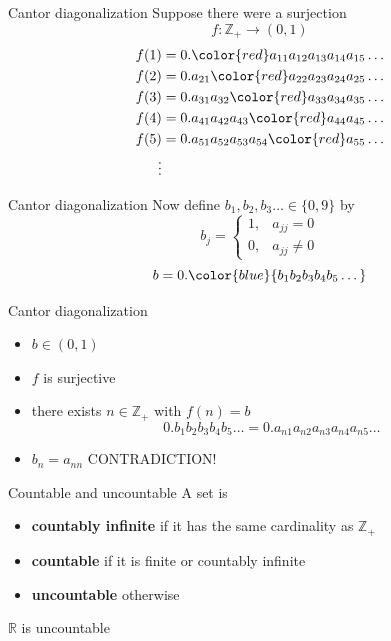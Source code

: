 \documentclass{beamer}
\begin{document}
\begin{frame}{Cantor diagonalization}
Suppose there were a surjection
$$f: \mathbb{Z}_+\rightarrow (0,1)$$
\pause
\begin{align*}
f(1) &= 0.{\color{red} a_{11}}a_{12}a_{13}a_{14}a_{15}\dots\\
f(2) &= 0.a_{21}{\color{red} a_{22}}a_{23}a_{24}a_{25}\dots\\
f(3) &= 0.a_{31}a_{32}{\color{red} a_{33}}a_{34}a_{35}\dots\\
f(4) &= 0.a_{41}a_{42}a_{43}{\color{red} a_{44}}a_{45}\dots\\
f(5) &= 0.a_{51}a_{52}a_{53}a_{54}{\color{red} a_{55}}\dots\\
\vdots 
\end{align*}
\end{frame}

\begin{frame}{Cantor diagonalization}
Now define $b_1,b_2,b_3\dots\in \{0,9\}$ by
$$b_j = \left\lbrace
\begin{array}{cc}
1, & a_{jj} = 0\\
0, & a_{jj} \neq 0
\end{array}\right.$$
\pause
$$b = 0.{\color{blue}{b_1b_2b_3b_4b_5\dots}}$$
\end{frame}

\begin{frame}{Cantor diagonalization}
\begin{itemize}
\item $b\in (0,1)$
\pause
\item $f$ is surjective
\pause
\item there exists $n\in\mathbb{Z}_+$ with $f(n) = b$
\pause
$$0.b_1b_2b_3b_4b_5\dots = 0.a_{n1}a_{n2}a_{n3}a_{n4}a_{n5}\dots$$
\pause
\item $b_n = a_{nn}$ \pause CONTRADICTION!
\end{itemize}
\end{frame}

\begin{frame}{Countable and uncountable}
A set is
\begin{itemize}
\pause
\item \textbf{countably infinite} if it has the same cardinality as $\mathbb{Z}_+$
\pause
\item \textbf{countable} if it is finite or countably infinite
\pause
\item \textbf{uncountable} otherwise
\end{itemize}
\pause
\begin{thm}
$\mathbb{R}$ is uncountable
\end{thm}
\end{frame}
\end{document}
